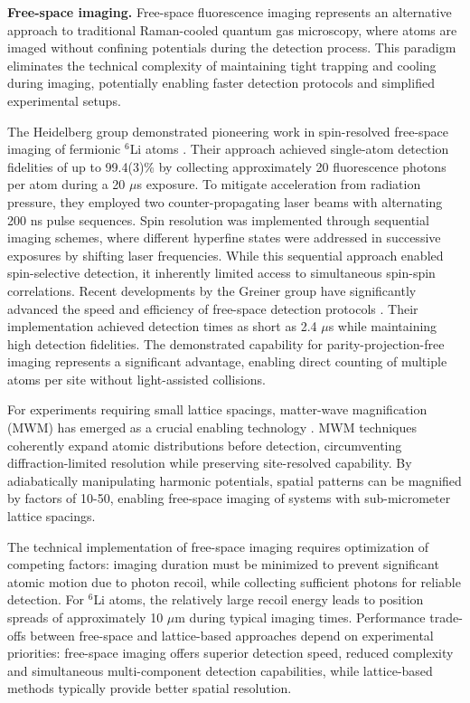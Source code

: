 \textbf{Free-space imaging.} Free-space fluorescence imaging represents an alternative approach to traditional Raman-cooled quantum gas microscopy, where atoms are imaged without confining potentials during the detection process. This paradigm eliminates the technical complexity of maintaining tight trapping and cooling during imaging, potentially enabling faster detection protocols and simplified experimental setups.

The Heidelberg group demonstrated pioneering work in spin-resolved free-space imaging of fermionic $^6$Li atoms \cite{bergschneider_spin-resolved_2018}. Their approach achieved single-atom detection fidelities of up to 99.4(3)\% by collecting approximately 20 fluorescence photons per atom during a 20 $\mu$s exposure. To mitigate acceleration from radiation pressure, they employed two counter-propagating laser beams with alternating 200 ns pulse sequences. Spin resolution was implemented through sequential imaging schemes, where different hyperfine states were addressed in successive exposures by shifting laser frequencies. While this sequential approach enabled spin-selective detection, it inherently limited access to simultaneous spin-spin correlations. Recent developments by the Greiner group have significantly advanced the speed and efficiency of free-space detection protocols \cite{su_fast_2025}. Their implementation achieved detection times as short as 2.4 $\mu$s while maintaining high detection fidelities. The demonstrated capability for parity-projection-free imaging represents a significant advantage, enabling direct counting of multiple atoms per site without light-assisted collisions.

For experiments requiring small lattice spacings, matter-wave magnification (MWM) has emerged as a crucial enabling technology \cite{murthy_matter-wave_2014, asteria_quantum_2021}. MWM techniques coherently expand atomic distributions before detection, circumventing diffraction-limited resolution while preserving site-resolved capability. By adiabatically manipulating harmonic potentials, spatial patterns can be magnified by factors of 10-50, enabling free-space imaging of systems with sub-micrometer lattice spacings.

The technical implementation of free-space imaging requires optimization of competing factors: imaging duration must be minimized to prevent significant atomic motion due to photon recoil, while collecting sufficient photons for reliable detection. For $^6$Li atoms, the relatively large recoil energy leads to position spreads of approximately 10 $\mu$m during typical imaging times. Performance trade-offs between free-space and lattice-based approaches depend on experimental priorities: free-space imaging offers superior detection speed, reduced complexity and simultaneous multi-component detection capabilities, while lattice-based methods typically provide better spatial resolution.


